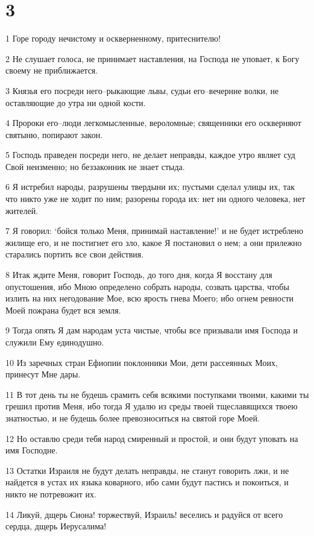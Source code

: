 \chapter{3}

\par 1 Горе городу нечистому и оскверненному, притеснителю!
\par 2 Не слушает голоса, не принимает наставления, на Господа не уповает, к Богу своему не приближается.
\par 3 Князья его посреди него--рыкающие львы, судьи его--вечерние волки, не оставляющие до утра ни одной кости.
\par 4 Пророки его--люди легкомысленные, вероломные; священники его оскверняют святыню, попирают закон.
\par 5 Господь праведен посреди него, не делает неправды, каждое утро являет суд Свой неизменно; но беззаконник не знает стыда.
\par 6 Я истребил народы, разрушены твердыни их; пустыми сделал улицы их, так что никто уже не ходит по ним; разорены города их: нет ни одного человека, нет жителей.
\par 7 Я говорил: `бойся только Меня, принимай наставление!' и не будет истреблено жилище его, и не постигнет его зло, какое Я постановил о нем; а они прилежно старались портить все свои действия.
\par 8 Итак ждите Меня, говорит Господь, до того дня, когда Я восстану для опустошения, ибо Мною определено собрать народы, созвать царства, чтобы излить на них негодование Мое, всю ярость гнева Моего; ибо огнем ревности Моей пожрана будет вся земля.
\par 9 Тогда опять Я дам народам уста чистые, чтобы все призывали имя Господа и служили Ему единодушно.
\par 10 Из заречных стран Ефиопии поклонники Мои, дети рассеянных Моих, принесут Мне дары.
\par 11 В тот день ты не будешь срамить себя всякими поступками твоими, какими ты грешил против Меня, ибо тогда Я удалю из среды твоей тщеславящихся твоею знатностью, и не будешь более превозноситься на святой горе Моей.
\par 12 Но оставлю среди тебя народ смиренный и простой, и они будут уповать на имя Господне.
\par 13 Остатки Израиля не будут делать неправды, не станут говорить лжи, и не найдется в устах их языка коварного, ибо сами будут пастись и покоиться, и никто не потревожит их.
\par 14 Ликуй, дщерь Сиона! торжествуй, Израиль! веселись и радуйся от всего сердца, дщерь Иерусалима!
